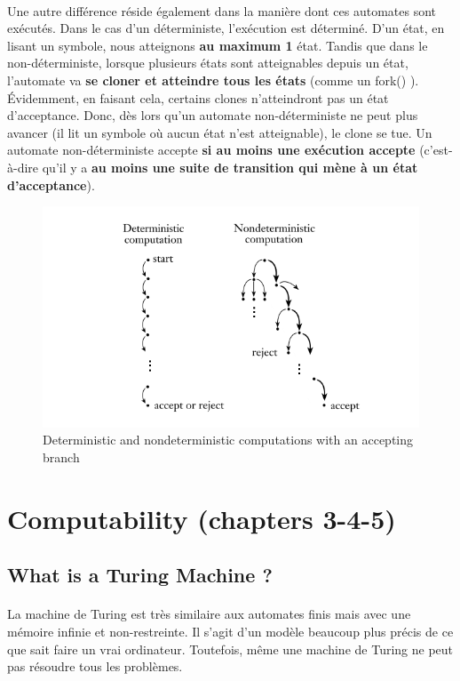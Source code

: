 \paragraph{}
Une autre différence réside également dans la manière dont ces automates sont exécutés. Dans le cas d'un déterministe, l'exécution est déterminé. D'un état, en lisant un symbole, nous atteignons\textbf{ au maximum 1} état. Tandis que dans le non-déterministe, lorsque plusieurs états sont atteignables depuis un état, l'automate va \textbf{se cloner et atteindre tous les états} (comme un fork() ). Évidemment, en faisant cela, certains clones n'atteindront pas un état d'acceptance. Donc, dès lors qu'un automate non-déterministe ne peut plus avancer (il lit un symbole où aucun état n'est atteignable), le clone se tue. Un automate non-déterministe accepte \textbf{si au moins une exécution accepte} (c'est-à-dire qu'il y a \textbf{au moins une suite de transition qui mène à un état d'acceptance}).
\begin{figure}[H]
\centering
\includegraphics[width=\textwidth]{img_2_2__0}
\caption{Deterministic and nondeterministic computations with an accepting branch}
\end{figure}

\section{Computability (chapters 3-4-5)}
\subsection{What is a Turing Machine ?}
\paragraph{}
La machine de Turing est très similaire aux automates finis mais avec une mémoire infinie et non-restreinte. Il s'agit d'un modèle beaucoup plus précis de ce que sait faire un vrai ordinateur. Toutefois, même une machine de Turing ne peut pas résoudre tous les problèmes.
